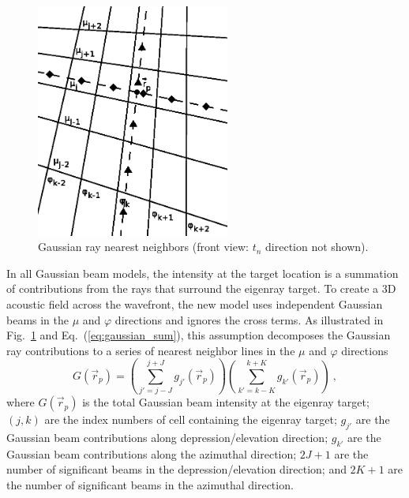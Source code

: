 \documentclass{ws-jca}
\newcommand{\threeD}{3\nobreakdash\textendash D }	%
\begin{document}
\begin{figure}[th]
	\centerline{\includegraphics[width=2.5in]{GaussianGeometry.eps}} 
	\vspace*{8pt}
	\caption{Gaussian ray nearest neighbors 
		(front view: \(t_n\) direction not shown).}
	\label{fig:ray_neighbors}
\end{figure}
In all Gaussian beam models, the intensity at the target location is a summation of
contributions from the rays that surround the eigenray target. 
To create a \threeD acoustic field across the wavefront, the new model uses 
independent Gaussian beams in the
\(\mu\) and \(\varphi\) directions and ignores the cross terms. As
illustrated in Fig.~\ref{fig:ray_neighbors} and
Eq.~(\ref{eq:gaussian_sum}), this assumption decomposes the Gaussian ray
contributions to a series of nearest neighbor lines in the \(\mu\) and
\(\varphi\) directions
\begin{equation}
	G(\vec{r}_p) = \left( \sum_{j'=j-J}^{j+J} g_{j'}(\vec{r}_p)\right) 
		\left( \sum_{k'=k-K}^{k+K} g_{k'}(\vec{r}_p)\right) \:,
	\label{eq:gaussian_sum}
\end{equation}
where
\(G(\vec{r}_p)\) is the total Gaussian beam intensity at the eigenray target;
$(j,k)$ are the index numbers of cell containing the eigenray target;
\(g_{j'}\) are the Gaussian beam contributions along depression/elevation direction;
\(g_{k'}\) are the Gaussian beam contributions along the azimuthal direction;
$2J+1$ are the number of significant beams in the depression/elevation direction; and
$2K+1$ are the number of significant beams in the azimuthal direction.
\end{document}
